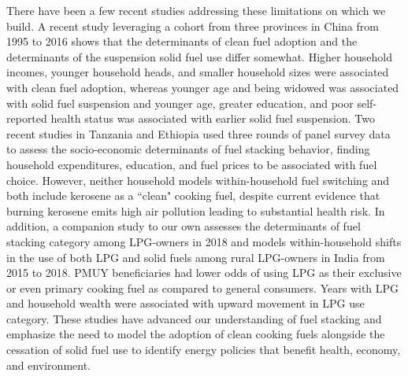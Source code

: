 \documentclass[11pt,english]{article}
\theoremstyle{plain} \newtheorem{claim}{Claim}
\theoremstyle{plain} \newtheorem{prop}{Proposition}
\theoremstyle{plain} \newtheorem{hypo}{Hypothesis}
\begin{document}
There have been a few recent studies addressing these limitations on which we build. A recent study leveraging a cohort from three provinces in China from 1995 to 2016 shows that the determinants of clean fuel adoption and the determinants of the suspension solid fuel use differ somewhat\citep{Carteretal2019}. Higher household incomes, younger household heads, and smaller household sizes were associated with clean fuel adoption, whereas younger age and being widowed was associated with solid fuel suspension and younger age, greater education, and poor self-reported health status was associated with earlier solid fuel suspension. Two recent studies in Tanzania\citep{ChoumertNkoloetal2019} and Ethiopia\citep{Alemetal2016} used three rounds of panel survey data to assess the socio-economic determinants of fuel stacking behavior, finding household expenditures, education, and fuel prices to be associated with fuel choice. However, neither household models within-household fuel switching and both include kerosene as a ``clean" cooking fuel, despite current evidence that burning kerosene emits high air pollution leading to substantial health risk\citep{Lametal2012}. In addition, a companion study to our own assesses the determinants of fuel stacking category among LPG-owners in 2018 and models within-household shifts in the use of both LPG and solid fuels among rural LPG-owners in India from 2015 to 2018\citep{Tripathietal2020}. PMUY beneficiaries had lower odds of using LPG as their exclusive or even primary cooking fuel as compared to general consumers. Years with LPG and household wealth were associated with upward movement in LPG use category. These studies have advanced our understanding of fuel stacking and emphasize the need to model the adoption of clean cooking fuels alongside the cessation of solid fuel use to identify energy policies that benefit health, economy, and environment. 

\end{document}
